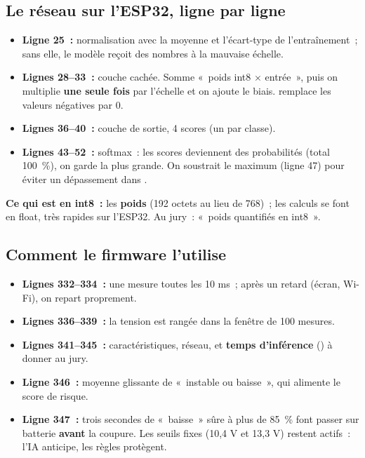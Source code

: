 \subsection{Le réseau sur l'ESP32, ligne par ligne}

\begin{itemize}
  \item \textbf{Ligne 25~:} normalisation avec la moyenne et l'écart-type de l'entraînement~; sans elle, le modèle reçoit des nombres à la mauvaise échelle.
  \item \textbf{Lignes 28--33~:} couche cachée. Somme «~poids int8 $\times$ entrée~», puis on multiplie \textbf{une seule fois} par l'échelle  et on ajoute le biais.  remplace les valeurs négatives par 0.
  \item \textbf{Lignes 36--40~:} couche de sortie, 4 scores (un par classe).
  \item \textbf{Lignes 43--52~:} softmax~: les scores deviennent des probabilités (total 100~\%), on garde la plus grande. On soustrait le maximum (ligne 47) pour éviter un dépassement dans .
\end{itemize}
\textbf{Ce qui est en int8~:} les \textbf{poids} (192 octets au lieu de 768)~; les calculs se font en float, très rapides sur l'ESP32. Au jury~: «~poids quantifiés en int8~».

\subsection{Comment le firmware l'utilise}

\begin{itemize}
  \item \textbf{Lignes 332--334~:} une mesure toutes les 10 ms~; après un retard (écran, Wi-Fi), on repart proprement.
  \item \textbf{Lignes 336--339~:} la tension est rangée dans la fenêtre de 100 mesures.
  \item \textbf{Lignes 341--345~:} caractéristiques, réseau, et \textbf{temps d'inférence} () à donner au jury.
  \item \textbf{Ligne 346~:} moyenne glissante de «~instable ou baisse~», qui alimente le score de risque.
  \item \textbf{Ligne 347~:} trois secondes de «~baisse~» sûre à plus de 85~\% font passer sur batterie \textbf{avant} la coupure. Les seuils fixes (10,4 V et 13,3 V) restent actifs~: l'IA anticipe, les règles protègent.
\end{itemize}

